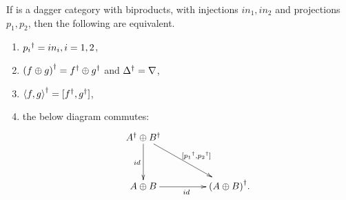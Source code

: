 \begin{lemma}\label{lemma:daggerbiproducts}
If \cD{} is a dagger category with biproducts, with injections $in_{1},in_{2}$ and projections
$p_{1},p_{2}$, then the following are equivalent.
\begin{enumerate}
  \item ${p_{i}}^{\dagger} = in_{i}, i=1,2$, \label{ldpdgrpisq}
  \item ${(f\oplus g)}^{\dagger} = {f}^{\dagger}\oplus{g}^{\dagger}$ and ${\Delta}^{\dagger} = \nabla$,\label{ldpddeltisnab}
  \item ${\langle f,g\rangle}^{\dagger} = [{f}^{\dagger},{g}^{\dagger}]$,\label{ldpdcopisprod}
  \item the below diagram commutes:\label{ldpcommute}
  \[
    \xymatrix @C+20pt @R+10pt{
      \dgr{A} \+ \dgr{B} \ar[d]_{id} \ar[dr]^{[\dgr{p_{1}},\dgr{p_{2}}]}\\
      A\+B\ar[r]_{id}&\dgr{(A\+B)}.
    }
  \]
\end{enumerate}
\end{lemma}
